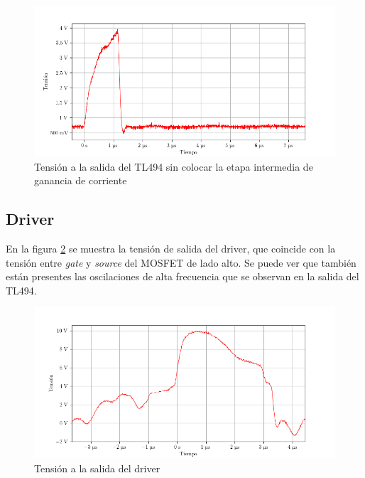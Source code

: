 \begin{figure}[H]
    \centering
    \includegraphics[width=\textwidth]{images/capturas-osciloscopio/TL494/pwm_vout_sin_bjt.png}
    \caption{Tensión a la salida del TL494 sin colocar la etapa intermedia de ganancia de corriente}
    \label{fig:pwm_vout_sin_bjt}
\end{figure}






\subsection{Driver}

En la figura \ref{fig:driver_vout_connected} se muestra la tensión de salida del driver, que coincide con la tensión entre \textit{gate} y \textit{source} del MOSFET de lado alto.
Se puede ver que también están presentes las oscilaciones de alta frecuencia que se observan en la salida del TL494.

\begin{figure}[H]
    \centering
    \includegraphics[width=\textwidth]{images/capturas-osciloscopio/17-11-2022/31.png} %
    \caption{Tensión a la salida del driver}
    \label{fig:driver_vout_connected}
\end{figure}

